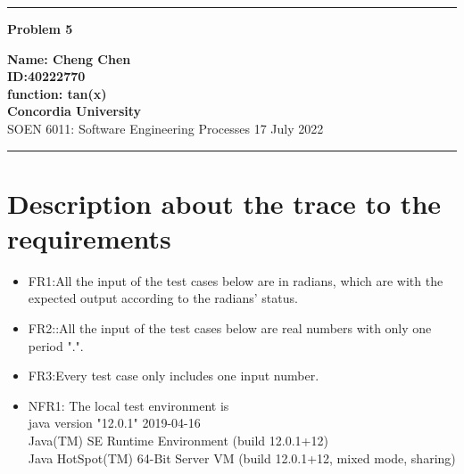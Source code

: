 \documentclass[10pt,a4paper,twoside]{article}
\begin{document}
\begin{center}
\hrule

\vspace{.4cm}
{\bf {\Huge Problem 5}}
\vspace{.2cm}
\end{center}
{\bf Name: Cheng Chen}  \\
{\bf ID:40222770}\\
{\bf function: tan(x)}\\
{\bf Concordia University}\\
SOEN 6011: Software Engineering Processes {\bf  } \hspace{\fill}  17 July  2022 \\
\hrule






\section{Description about the trace to the requirements}
\begin{itemize}
    \item FR1:All the input of the test cases below are in radians, which are with the expected output according to the radians' status.
    \item FR2::All the input of the test cases below are real numbers with only one period ".".
    \item FR3:Every test case only includes one input number.
    \item NFR1: The local test environment is\\
    java version "12.0.1" 2019-04-16\\
Java(TM) SE Runtime Environment (build 12.0.1+12)\\
Java HotSpot(TM) 64-Bit Server VM (build 12.0.1+12, mixed mode, sharing)
\end{itemize}
\end{document}
